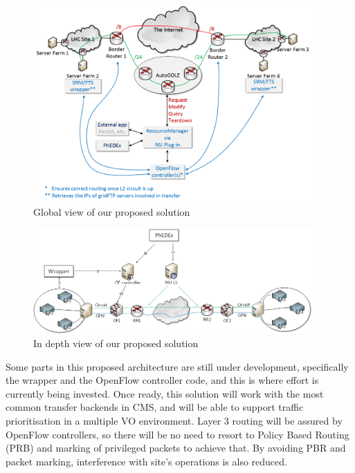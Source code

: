 \begin{figure}[h]
  \centering
  \includegraphics[width=0.95\textwidth]{Figures/Proposed_solution-global_view.png}
  \caption{Global view of our proposed solution}
  \label{fig:global-solution-view}
\end{figure} 

\begin{figure}[h]
  \centering
  \includegraphics[width=0.95\textwidth]{Figures/Proposed_solution-zoom_view.png}
  \caption{In depth view of our proposed solution}
  \label{fig:zoom-solution-view}
\end{figure}

Some parts in this proposed architecture are still under development, specifically
the wrapper and the OpenFlow controller code, and this is where effort is 
currently being invested.
Once ready, this solution will work with the most common transfer backends in CMS,
and will be able to support traffic prioritisation in a multiple VO environment. 
Layer 3 routing will be assured by OpenFlow controllers, so there will be no need 
to resort to Policy Based Routing (PRB) and marking of privileged packets to achieve that.
By avoiding PBR and packet marking, interference with site's operations is also reduced.